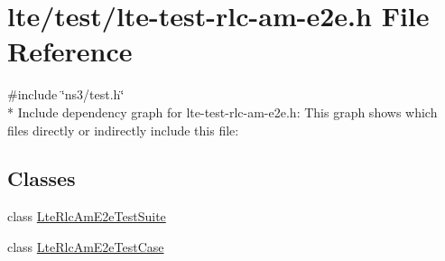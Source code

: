 \hypertarget{lte-test-rlc-am-e2e_8h}{}\section{lte/test/lte-\/test-\/rlc-\/am-\/e2e.h File Reference}
\label{lte-test-rlc-am-e2e_8h}
{\ttfamily \#include \char`\"{}ns3/test.\+h\char`\"{}}\\*
Include dependency graph for lte-\/test-\/rlc-\/am-\/e2e.h\+:
This graph shows which files directly or indirectly include this file\+:
\subsection*{Classes}
\begin{DoxyCompactItemize}
\item 
class \hyperlink{classLteRlcAmE2eTestSuite}{Lte\+Rlc\+Am\+E2e\+Test\+Suite}
\item 
class \hyperlink{classLteRlcAmE2eTestCase}{Lte\+Rlc\+Am\+E2e\+Test\+Case}
\end{DoxyCompactItemize}
